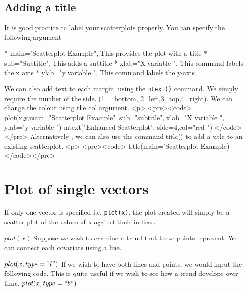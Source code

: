 
\subsection{Adding a title }

It is good practice to label your scatterplots properly. You can specify the following argument

* 	main="Scatterplot Example", 	This provides the plot with a title
* 	sub="Subtitle",                 This adds a subtitle
* 	xlab="X variable ",				This command labels the x axis 
*    ylab="y variable ",				This command labels the y-axis

We can also add text to each margin, using the \texttt{mtext()} command.  
We simply require the number of the side. (1 = bottom, 2=left,3=top,4=right). 
We can change the colour using the col argument.
<p> 
<pre><code>
plot(x,y,main="Scatterplot Example",   sub="subtitle",    xlab="X variable ", ylab="y variable ")	
mtext("Enhanced Scatterplot", side=4,col="red ")
</code></pre>\normalsize
Alternatively , we can also use the command title() to add a title to an existing scatterplot.
<p> <pre><code>
title(main="Scatterplot Example)	
</code></pre>\normalsize




\section{Plot of single vectors}
If only one vector is specified i.e. \texttt{plot(x)},  the plot created will simply be a scatter-plot of the values of x against their indices.

$plot(x)$
Suppose we wish to examine a trend that these points represent. We can connect each covariate using a line.

$plot(x, type = "l")$
If we wish to have both lines and points, we would input the following code. This is quite useful if we wish to see how a trend develops over time.
$plot(x, type = "b")$


